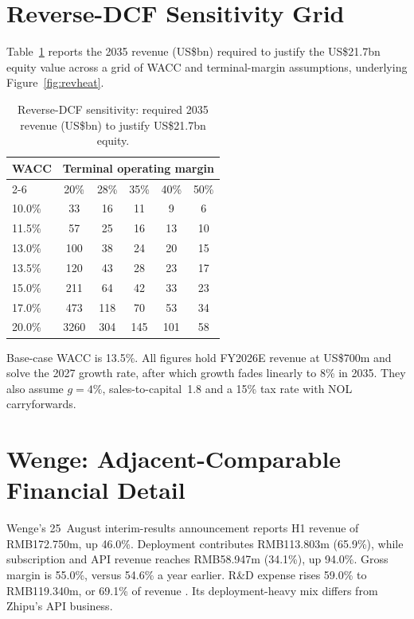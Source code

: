 \documentclass[11pt]{article}
\begin{document}


\clearpage
\section{Reverse-DCF Sensitivity Grid}
\label{sec:revheat}
Table~\ref{tab:revheat} reports the 2035 revenue (US\$bn) required to justify the US\$21.7bn equity value
across a grid of WACC and terminal-margin assumptions, underlying Figure~\ref{fig:revheat}.

\begin{table}[H]
\centering
\caption{Reverse-DCF sensitivity: required 2035 revenue (US\$bn) to justify US\$21.7bn equity.}
\label{tab:revheat}
\begin{tabular}{lccccc}
\toprule
WACC & \multicolumn{5}{c}{Terminal operating margin} \\
\cmidrule(lr){2-6}
 & 20\% & 28\% & 35\% & 40\% & 50\% \\
\midrule
10.0\% & 33 & 16 & 11 & 9 & 6 \\
11.5\% & 57 & 25 & 16 & 13 & 10 \\
13.0\% & 100 & 38 & 24 & 20 & 15 \\
13.5\% & 120 & 43 & 28 & 23 & 17 \\
15.0\% & 211 & 64 & 42 & 33 & 23 \\
17.0\% & 473 & 118 & 70 & 53 & 34 \\
20.0\% & 3260 & 304 & 145 & 101 & 58 \\
\bottomrule
\end{tabular}

{\footnotesize Base-case WACC is 13.5\%. All figures hold FY2026E revenue at US\$700m and solve the 2027
growth rate, after which growth fades linearly to 8\% in 2035. They also assume $g=4\%$,
sales-to-capital~1.8 and a 15\% tax rate with NOL carryforwards.}
\end{table}

\clearpage
\section{Wenge: Adjacent-Comparable Financial Detail}
\label{sec:wenge}
Wenge's 25~August interim-results announcement reports H1 revenue of RMB172.750m, up 46.0\%. Deployment contributes RMB113.803m (65.9\%), while subscription and API revenue reaches RMB58.947m (34.1\%), up 94.0\%. Gross margin is 55.0\%, versus 54.6\% a year earlier. R\&D expense rises 59.0\% to RMB119.340m, or 69.1\% of revenue \citep{wengeh12026}. Its deployment-heavy mix differs from Zhipu's API business.
\end{document}
